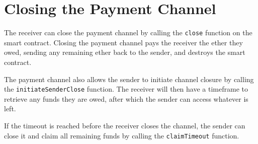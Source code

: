 \section{Closing the Payment Channel}\label{sec:closing-the-payment-channel}
The receiver can close the payment channel by calling the \texttt{close} function
on the smart contract.
Closing the payment channel pays the receiver the ether they owed, sending any
remaining ether back to the sender, and destroys the smart contract.



The payment channel also allows the sender to initiate channel closure
by calling the \texttt{initiateSenderClose} function.
The receiver will then have a timeframe to retrieve any funds they are owed,
after which the sender can access whatever is left.



If the timeout is reached before the receiver closes the channel, the sender can
close it and claim all remaining funds by calling the \texttt{claimTimeout}
function.

